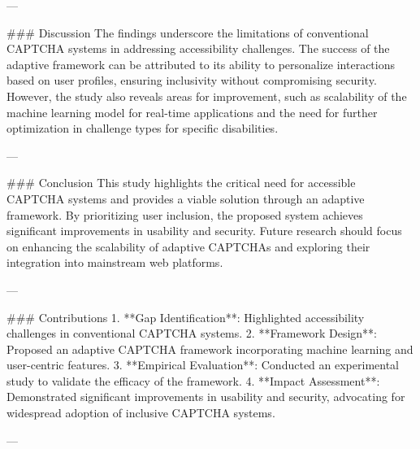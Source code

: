---

### Discussion
The findings underscore the limitations of conventional CAPTCHA systems in addressing accessibility challenges. The success of the adaptive framework can be attributed to its ability to personalize interactions based on user profiles, ensuring inclusivity without compromising security. However, the study also reveals areas for improvement, such as scalability of the machine learning model for real-time applications and the need for further optimization in challenge types for specific disabilities.

---

### Conclusion
This study highlights the critical need for accessible CAPTCHA systems and provides a viable solution through an adaptive framework. By prioritizing user inclusion, the proposed system achieves significant improvements in usability and security. Future research should focus on enhancing the scalability of adaptive CAPTCHAs and exploring their integration into mainstream web platforms.

---

### Contributions
1. **Gap Identification**: Highlighted accessibility challenges in conventional CAPTCHA systems.
2. **Framework Design**: Proposed an adaptive CAPTCHA framework incorporating machine learning and user-centric features.
3. **Empirical Evaluation**: Conducted an experimental study to validate the efficacy of the framework.
4. **Impact Assessment**: Demonstrated significant improvements in usability and security, advocating for widespread adoption of inclusive CAPTCHA systems.

---